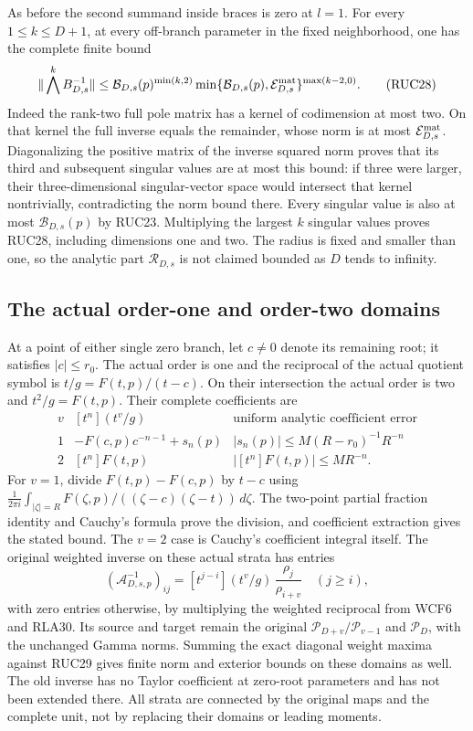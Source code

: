 \documentclass[11pt]{article}
\begin{document}
As before the second summand inside braces is zero at $l=1$.
For every $1\le k\le D+1$, at every off-branch parameter in the
fixed neighborhood, one has the complete finite bound
\[
 \|\bigwedge^k B_{D,s}^{-1}\|
 \le \mathcal B_{D,s}(p)^{\min(k,2)}
      \min\{\mathcal B_{D,s}(p),\mathcal E_{D,s}^{\rm mat}\}
                                      ^{\max(k-2,0)}.
 \tag{RUC28}
\]
Indeed the rank-two full pole matrix has a kernel of codimension
at most two.  On that kernel the full inverse equals the remainder,
whose norm is at most $\mathcal E_{D,s}^{\rm mat}$.  Diagonalizing
the positive matrix of the inverse squared norm proves that its
third and subsequent singular values are at most this bound: if
three were larger, their three-dimensional singular-vector space
would intersect that kernel nontrivially, contradicting the norm
bound there.  Every singular value is also at most
$\mathcal B_{D,s}(p)$ by RUC23.  Multiplying the largest $k$
singular values proves RUC28, including dimensions one and two.
The radius is fixed and smaller than one, so the analytic part
$\mathcal R_{D,s}$ is not claimed bounded as $D$ tends to infinity.

\subsection{The actual order-one and order-two domains}

At a point of either single zero branch, let $c\ne0$ denote its
remaining root; it satisfies $|c|\le r_0$.  The actual order is
one and the reciprocal of the actual quotient symbol is
$t/g=F(t,p)/(t-c)$.  On their intersection the actual order is
two and $t^2/g=F(t,p)$.  Their complete coefficients are
\[
 \begin{array}{c|c|c}
 v&[t^n](t^v/g)&\text{uniform analytic coefficient error}\\\hline
 1&-F(c,p)c^{-n-1}+s_n(p)&
 |s_n(p)|\le M(R-r_0)^{-1}R^{-n}\\[2pt]
 2&[t^n]F(t,p)&|[t^n]F(t,p)|\le MR^{-n}.
 \end{array}\tag{RUC29}
\]
For $v=1$, divide $F(t,p)-F(c,p)$ by $t-c$ using
$\frac1{2\pi i}\int_{|\zeta|=R}
F(\zeta,p)/((\zeta-c)(\zeta-t))\,d\zeta$.
The two-point partial fraction identity and Cauchy's formula
prove the division, and coefficient extraction gives the stated
bound.  The $v=2$ case is Cauchy's coefficient integral itself.
The original weighted inverse on these actual strata has entries
\[
 (\mathcal A_{D,s,p}^{-1})_{ij}
     =[t^{j-i}](t^v/g)\,\frac{\rho_j}{\rho_{i+v}}\quad(j\ge i),
 \tag{RUC30}
\]
with zero entries otherwise, by multiplying the weighted reciprocal
from WCF6 and RLA30.  Its source and target remain the original
$\mathcal P_{D+v}/\mathcal P_{v-1}$ and $\mathcal P_D$, with
the unchanged Gamma norms.  Summing the exact diagonal weight
maxima against RUC29 gives finite norm and exterior bounds on
these domains as well.  The old inverse has no Taylor coefficient
at zero-root parameters and has not been extended there.  All
strata are connected by the original maps and the complete unit,
not by replacing their domains or leading moments.
\end{document}
